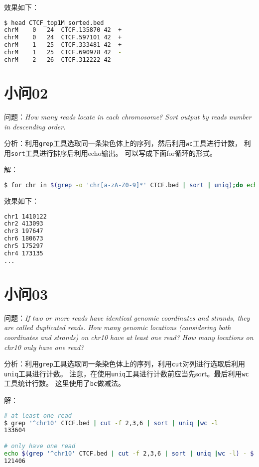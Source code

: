 \documentclass[cn,black,11pt,normal]{elegantnote}
\begin{document}
效果如下：
\begin{lstlisting}[language=bash]
$ head CTCF_top1M_sorted.bed 
chrM	0	24	CTCF.135870	42	+
chrM	0	24	CTCF.597101	42	+
chrM	1	25	CTCF.333481	42	+
chrM	1	25	CTCF.690978	42	-
chrM	2	26	CTCF.312222	42	-
\end{lstlisting}

\section{小问02}
问题：\textit{How many reads locate in each chromosome? Sort output by reads number in descending order.}

分析：利用\texttt{grep}工具选取同一条染色体上的序列，然后利用\texttt{wc}工具进行计数，
利用\texttt{sort}工具进行排序后利用echo输出。
可以写成下面for循环的形式。

解：
\begin{lstlisting}[language=bash]
$ for chr in $(grep -o 'chr[a-zA-Z0-9]*' CTCF.bed | sort | uniq);do echo $chr $(grep $chr CTCF.bed| wc -l); done | sort -t' ' -k2nr
\end{lstlisting}

效果如下：
\begin{lstlisting}[language=bash]
chr1 1410122
chr2 413093
chr3 197647
chr6 180673
chr5 175297
chr4 173135
...
\end{lstlisting}

\section{小问03}
问题：\textit{If two or more reads have identical genomic coordinates and strands,
 they are called duplicated reads.
  How many genomic locations (considering both coordinates and strands)
   on chr10 have at least one read? How many locations on chr10 only have one read?}

分析：利用\texttt{grep}工具选取同一条染色体上的序列，利用\texttt{cut}对列进行选取后利用\texttt{uniq}工具进行计数。
注意，在使用\texttt{uniq}工具进行计数前应当先sort。最后利用\texttt{wc}工具统计行数。
这里使用了\texttt{bc}做减法。

解：
\begin{lstlisting}[language=bash]
# at least one read
$ grep '^chr10' CTCF.bed | cut -f 2,3,6 | sort | uniq |wc -l
133604

# only have one read
echo $(grep '^chr10' CTCF.bed | cut -f 2,3,6 | sort | uniq |wc -l) - $(grep '^chr10' CTCF.bed | cut -f 2,3,6 | sort | uniq -d |wc -l) | bc
121406

\end{lstlisting}
\end{document}
